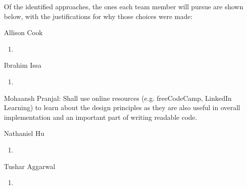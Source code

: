 \documentclass[12pt, titlepage]{article}
\begin{document}
Of the identified approaches, the ones each team member will pursue are shown below, with the justifications for why those choices were made:
\begin{enumerate}
    \begin{item}
        Allison Cook
        \begin{enumerate}
            \item 
        \end{enumerate}
    \end{item}
    \begin{item}
        Ibrahim Issa
        \begin{enumerate}
            \item 
        \end{enumerate}
    \end{item}
    \begin{item}
        Mohaansh Pranjal: Shall use online resources (e.g. freeCodeCamp, LinkedIn Learning) to learn about the design principles as they are also useful in overall implementation and an important part of writing readable code.
    \end{item}
    \begin{item}
        Nathaniel Hu
        \begin{enumerate}
            \item 
        \end{enumerate}
    \end{item}
    \begin{item}
        Tushar Aggarwal
        \begin{enumerate}
            \item 
        \end{enumerate}
    \end{item}
\end{enumerate}
\end{document}
